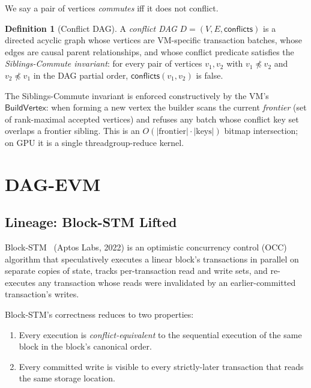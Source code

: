 \documentclass[11pt]{article}
\theoremstyle{definition}
\newtheorem{definition}[theorem]{Definition}
\begin{document}
We say a pair of vertices \emph{commutes} iff it does not conflict.

\begin{definition}[Conflict DAG]
A \emph{conflict DAG} $D = (V, E, \mathsf{conflicts})$ is a directed acyclic
graph whose vertices are VM-specific transaction batches, whose edges are
causal parent relationships, and whose conflict predicate satisfies the
\emph{Siblings-Commute invariant}: for every pair of vertices $v_1, v_2$
with $v_1 \not\preceq v_2$ and $v_2 \not\preceq v_1$ in the DAG partial
order, $\mathsf{conflicts}(v_1, v_2)$ is false.
\end{definition}

The Siblings-Commute invariant is enforced constructively by the VM's
$\mathsf{BuildVertex}$: when forming a new vertex the builder scans the
current \emph{frontier} (set of rank-maximal accepted vertices) and refuses
any batch whose conflict key set overlaps a frontier sibling. This is an
$O(|\text{frontier}| \cdot |\text{keys}|)$ bitmap intersection; on GPU it
is a single threadgroup-reduce kernel.

\section{DAG-EVM}
\label{sec:dagevm}

\subsection{Lineage: Block-STM Lifted}

Block-STM~\cite{blockstm} (Aptos Labs, 2022) is an optimistic concurrency
control (OCC) algorithm that speculatively executes a linear block's
transactions in parallel on separate copies of state, tracks per-transaction
read and write sets, and re-executes any transaction whose reads were
invalidated by an earlier-committed transaction's writes.

Block-STM's correctness reduces to two properties:
\begin{enumerate}
  \item Every execution is \emph{conflict-equivalent} to the sequential
    execution of the same block in the block's canonical order.
  \item Every committed write is visible to every strictly-later transaction
    that reads the same storage location.
\end{enumerate}
\end{document}

